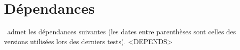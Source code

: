 \documentclass{tutodoc}
\begin{document}
\section{Dépendances}

\thisproj\ admet les dépendances suivantes (les dates entre parenthèses sont celles des versions utilisées lors des derniers tests).
<DEPENDS>
\end{document}
